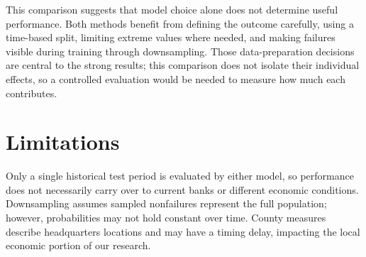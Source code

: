 \documentclass[11pt,a4paper]{article}
\begin{document}
This comparison suggests that model choice alone does not determine useful performance. Both methods benefit from defining the outcome carefully, using a time-based split, limiting extreme values where needed, and making failures visible during training through downsampling. Those data-preparation decisions are central to the strong results; this comparison does not isolate their individual effects, so a controlled evaluation would be needed to measure how much each contributes.


\section{Limitations}
Only a single historical test period is evaluated by either model, so performance does not necessarily carry over to current banks or different economic conditions. Downsampling assumes sampled nonfailures represent the full population; however, probabilities may not hold constant over time. County measures describe headquarters locations and may have a timing delay, impacting the local economic portion of our research.
\end{document}
